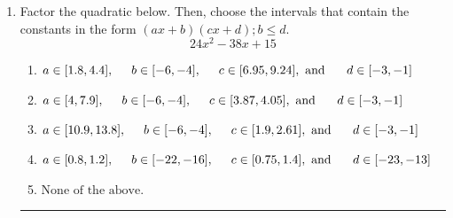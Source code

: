 \documentclass[14pt]{extbook}
\newcommand{\litem}[1]{\item#1\hspace*{-1cm}\rule{\textwidth}{0.4pt}}
\begin{document}
\begin{enumerate}
{\begin{enumerate}[label=\Alph*.]
\end{enumerate} }
\litem{
Factor the quadratic below. Then, choose the intervals that contain the constants in the form $(ax+b)(cx+d); b \leq d.$\[ 24x^{2} -38 x + 15 \]\begin{enumerate}[label=\Alph*.]
\item \( a \in [1.8, 4.4], \hspace*{5mm} b \in [-6, -4], \hspace*{5mm} c \in [6.95, 9.24], \text{ and } \hspace*{5mm} d \in [-3, -1] \)
\item \( a \in [4, 7.9], \hspace*{5mm} b \in [-6, -4], \hspace*{5mm} c \in [3.87, 4.05], \text{ and } \hspace*{5mm} d \in [-3, -1] \)
\item \( a \in [10.9, 13.8], \hspace*{5mm} b \in [-6, -4], \hspace*{5mm} c \in [1.9, 2.61], \text{ and } \hspace*{5mm} d \in [-3, -1] \)
\item \( a \in [0.8, 1.2], \hspace*{5mm} b \in [-22, -16], \hspace*{5mm} c \in [0.75, 1.4], \text{ and } \hspace*{5mm} d \in [-23, -13] \)
\item \( \text{None of the above.} \)

\end{enumerate} }
\end{enumerate}
\end{document}
